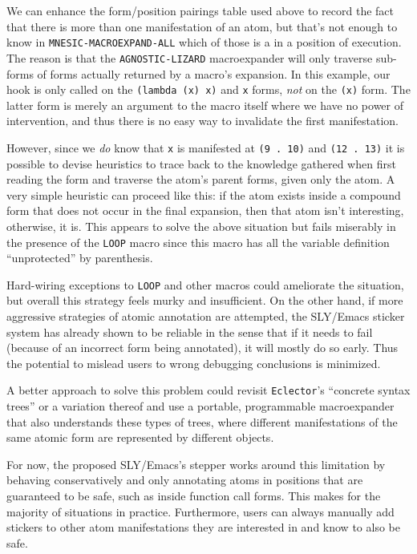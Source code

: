 \documentclass[sigconf]{acmart}
\begin{document}
We can enhance the form/position pairings table used above to record
the fact that there is more than one manifestation of an atom, but
that's not enough to know in \texttt{MNESIC-MACROEXPAND-ALL} which of
those is a in a position of execution.  The reason is that the
\texttt{AGNOSTIC-LIZARD} macroexpander will only traverse sub-forms of
forms actually returned by a macro's expansion.  In this example, our
hook is only called on the \texttt{(lambda (x) x)} and \texttt{x}
forms, \emph{not} on the \texttt{(x)} form.  The latter form is merely
an argument to the macro itself where we have no power of
intervention, and thus there is no easy way to invalidate the first
manifestation.

However, since we \emph{do} know that \texttt{x} is manifested at
\texttt{(9 . 10)} and \texttt{(12 . 13)} it is possible to devise
heuristics to trace back to the knowledge gathered when first reading
the form and traverse the atom's parent forms, given only the atom.  A
very simple heuristic can proceed like this: if the atom exists inside
a compound form that does not occur in the final expansion, then that
atom isn't interesting, otherwise, it is.  This appears to solve the
above situation but fails miserably in the presence of the
\texttt{LOOP} macro since this macro has all the variable definition
``unprotected'' by parenthesis.

Hard-wiring exceptions to \texttt{LOOP} and other macros could
ameliorate the situation, but overall this strategy feels murky and
insufficient.  On the other hand, if more aggressive strategies of
atomic annotation are attempted, the SLY/Emacs sticker system has
already shown to be reliable in the sense that if it needs to fail
(because of an incorrect form being annotated), it will mostly do so
early.  Thus the potential to mislead users to wrong debugging
conclusions is minimized.

A better approach to solve this problem could revisit
\texttt{Eclector}'s ``concrete syntax trees'' or a variation thereof
and use a portable, programmable macroexpander that also understands
these types of trees, where different manifestations of the same
atomic form are represented by different objects.

For now, the proposed SLY/Emacs's stepper works around this limitation
by behaving conservatively and only annotating atoms in positions that
are guaranteed to be safe, such as inside function call forms.  This
makes for the majority of situations in practice.  Furthermore, users
can always manually add stickers to other atom manifestations they are
interested in and know to also be safe.
\end{document}
